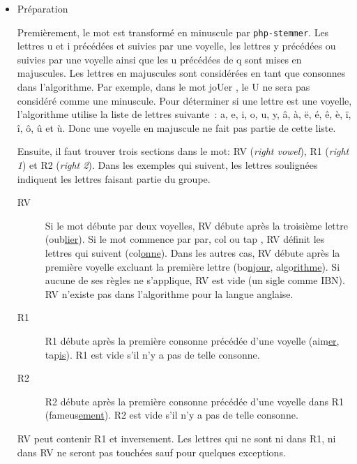 \begin{itemize}

\item{Préparation}

Premièrement, le mot est transformé en minuscule par \texttt{php-stemmer}.
Les lettres u et i précédées et suivies par une voyelle, les lettres y précédées ou suivies par une voyelle ainsi que les u précédées de q sont mises en majuscules.
Les lettres en majuscules sont considérées en tant que consonnes dans l'algorithme.
Par exemple, dans le mot \og joUer \fg{}, le U ne sera pas considéré comme une minuscule.
Pour déterminer si une lettre est une voyelle, l'algorithme utilise la liste de lettres suivante~: a, e, i, o, u, y, â, à, ë, é, ê, è, ï, î, ô, û et ù.
Donc une voyelle en majuscule ne fait pas partie de cette liste.

Ensuite, il faut trouver trois sections dans le mot: RV (\emph{right vowel}), R1 (\emph{right 1}) et R2 (\emph{right 2}).
Dans les exemples qui suivent, les lettres soulignées indiquent les lettres faisant partie du groupe.

\begin{description}
  \item[RV]
  
  Si le mot débute par deux voyelles, RV débute après la troisième lettre (oub\underline{lier}).
  Si le mot commence par \og par, col ou tap \fg{}, RV définit les lettres qui suivent (col\underline{onne}).
  Dans les autres cas, RV débute après la première voyelle excluant la première lettre (bo\underline{njour}, algo\underline{rithme}).
  Si aucune de ses règles ne s'applique, RV est vide (un sigle comme IBN).
  RV n'existe pas dans l'algorithme pour la langue anglaise.
  
  \item[R1]
  
  R1 débute après la première consonne précédée d'une voyelle (aim\underline{er}, tap\underline{is}).
  R1 est vide s'il n'y a pas de telle consonne.
  
  \item[R2]
  
  R2 débute après la première consonne précédée d'une voyelle dans R1 (fameus\underline{ement}).
  R2 est vide s'il n'y a pas de telle consonne.
\end{description}

RV peut contenir R1 et inversement.
Les lettres qui ne sont ni dans R1, ni dans RV ne seront pas touchées sauf pour quelques exceptions.


\end{itemize}
